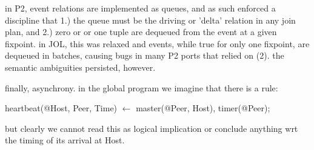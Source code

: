   in P2, event relations are implemented as queues, and as such enforced a discipline that 1.) the queue must be the driving or 'delta' relation in any join plan, and 2.) zero or or one tuple are dequeued from the event at a given fixpoint.  in JOL, this was relaxed and events, while true for only one fixpoint, are dequeued in batches, causing bugs in many P2 ports that relied on (2).  the semantic ambiguities persisted, however.

finally, asynchrony.  in the global program we imagine that there is a rule:

\begin{Dedalus}
heartbeat(@Host, Peer, Time) \(\leftarrow\) master(@Peer, Host), timer(@Peer);
\end{Dedalus}

but clearly we cannot read this as logical implication or conclude anything wrt the timing of its arrival at Host.


